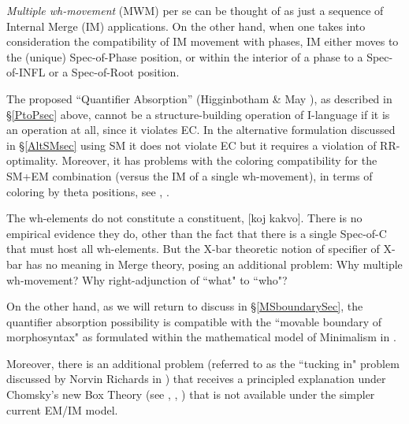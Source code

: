 \documentclass[12pt]{amsart}
\numberwithin{equation}{section}
\begin{document}
{\em Multiple wh-movement} (MWM) per se 
can be thought of as just a sequence of Internal Merge (IM) applications. 
On the other hand, when one takes into consideration the compatibility
of IM movement with phases, IM either moves to the (unique)
Spec-of-Phase position, or within the interior of a phase to a Spec-of-INFL
or a Spec-of-Root position.  

\smallskip

The proposed ``Quantifier Absorption” (Higginbotham \& May \cite{Higg}), 
as described in \S \ref{PtoPsec} above, cannot be a structure-building 
 operation of I-language if it is an operation at all, since it violates EC. In the alternative formulation 
 discussed in \S \ref{AltSMsec} using SM it does not violate EC but it requires a violation of RR-optimality. 
 Moreover, it has problems with the coloring compatibility for the SM+EM combination
 (versus the IM of a single wh-movement), in terms of coloring by theta positions, see \cite{MHL}, \cite{MarLar}.
 
 \smallskip
 
 The wh-elements do not constitute a constituent, [koj kakvo]. 
 There is no empirical evidence they do, other than the fact that there is a single Spec-of-C 
 that must host all wh-elements. But the X-bar theoretic notion of specifier of X-bar 
 has no meaning in Merge theory, posing an additional problem: Why multiple wh-movement? 
 Why right-adjunction of ``what" to ``who"? 
 
 \smallskip
 
 On the other hand, as we will return to discuss in \S \ref{MSboundarySec}, the
 quantifier absorption possibility is compatible with the ``movable boundary of
 morphosyntax" as formulated within the mathematical model of Minimalism in
 \cite{SentMar}.
 
 \smallskip
 
Moreover, there is an additional problem (referred to as the ``tucking in" problem discussed by Norvin 
Richards in \cite{NRich}) that receives a principled explanation under 
Chomsky's new Box Theory (see \cite{ChomskyKeio},  \cite{Chomsky23a}, \cite{Chomsky23b}) 
that is not available under the simpler current EM/IM model. 
 
 \smallskip
 
\end{document}
